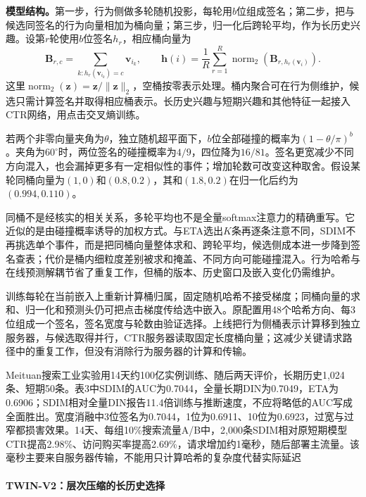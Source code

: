 \textbf{模型结构。}第一步，行为侧做多轮随机投影，每轮用$b$位组成签名；第二步，把与候选同签名的行为向量相加为桶向量；第三步，归一化后跨轮平均，作为长历史兴趣。设第$r$轮使用$b$位签名$h_r$，相应桶向量为
\begin{equation}
  \bm{B}_{r,c}=\sum_{k:h_r(\bm{v}_{i_k})=c}\bm{v}_{i_k},\qquad
  \bm{h}(i)=\frac{1}{R}\sum_{r=1}^{R}
       \operatorname{norm}_2(\bm{B}_{r,h_r(\bm{v}_i)}).
  \label{eq:rs-sdim-buckets}
\end{equation}
这里$\operatorname{norm}_2(\bm{z})=\bm{z}/\lVert\bm{z}\rVert_2$，空桶按零表示处理。桶内聚合可在行为侧维护，候选只需计算签名并取得相应桶表示。长历史兴趣与短期兴趣和其他特征一起接入CTR网络，用点击交叉熵训练。

若两个非零向量夹角为$\theta$，独立随机超平面下，$b$位全部碰撞的概率为$(1-\theta/\pi)^b$。夹角为$60^\circ$时，两位签名的碰撞概率为$4/9$，四位降为$16/81$。签名更宽减少不同方向混入，也会漏掉更多有一定相似性的事件；增加轮数可改变这种取舍。假设某轮同桶向量为$(1,0)$和$(0.8,0.2)$，其和$(1.8,0.2)$在归一化后约为$(0.994,0.110)$。

同桶不是经核实的相关关系，多轮平均也不是全量softmax注意力的精确重写。它近似的是由碰撞概率诱导的加权方式。与ETA选出$K$条再逐条注意不同，SDIM不再挑选单个事件，而是把同桶向量整体求和、跨轮平均，候选侧成本进一步降到签名查表；代价是桶内细粒度差别被求和掩盖、不同方向可能碰撞混入。行为哈希与在线预测解耦节省了重复工作，但桶的版本、历史窗口及嵌入变化仍需维护。

训练每轮在当前嵌入上重新计算桶归属，固定随机哈希不接受梯度；同桶向量的求和、归一化和预测头仍可把点击梯度传给选中嵌入。原配置用48个哈希方向、每3位组成一个签名，签名宽度与轮数由验证选择。上线把行为侧桶表示计算移到独立服务器，与候选取得并行，CTR服务器读取固定长度桶向量；这减少关键请求路径中的重复工作，但没有消除行为服务器的计算和传输。

Meituan搜索工业实验用14天约100亿实例训练、随后两天评价，长期历史1,024条、短期50条。表3中SDIM的AUC为0.7044，全量长期DIN为0.7049，ETA为0.6906；SDIM相对全量DIN报告11.4倍训练与推断速度，不应将略低的AUC写成全面胜出。宽度消融中3位签名为0.7044，1位为0.6911、10位为0.6923，过宽与过窄都损害效果。14天、每组10\%搜索流量A/B中，2,000条SDIM相对原短期模型CTR提高2.98\%、访问购买率提高2.69\%，请求增加约1毫秒，随后部署主流量。该毫秒主要来自服务器传输，不能用只计算哈希的复杂度代替实际延迟

\paragraph{TWIN-V2：层次压缩的长历史选择}
\label{sec:rs-twin-v2}

